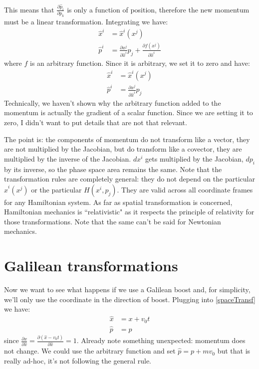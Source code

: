 \documentclass[aps,pra,10pt,floatfix,nofootinbib]{revtex4-1}
\theoremstyle{definition}
\begin{document}
This means that $\frac{\partial \hat{p}_i}{\partial p_k}$ is only a function of position, therefore the new momentum must be a linear transformation. Integrating we have:
\begin{equation*}
\begin{aligned}
\hat{x}^i &= \hat{x}^i(x^j) \\
\hat{p}^i &= \frac{\partial x^j}{\partial \hat{x}^i} p_j + \frac{\partial f(x^j)}{\partial \hat{x}^i}
\end{aligned}
\end{equation*}
where $f$ is an arbitrary function. Since it is arbitrary, we set it to zero and have:
\begin{equation}
\begin{aligned}
\hat{x}^i &= \hat{x}^i(x^j) \\
\hat{p}^i &= \frac{\partial x^j}{\partial \hat{x}^i} p_j
\end{aligned}
\label{spaceTransf}
\end{equation}
Technically, we haven't shown why the arbitrary function added to the momentum is actually the gradient of a scalar function. Since we are setting it to zero, I didn't want to put details that are not that relevant.

The point is: the components of momentum do not transform like a vector, they are not multiplied by the Jacobian, but do transform like a covector, they are multiplied by the inverse of the Jacobian. $dx^i$ gets multiplied by the Jacobian, $dp_i$ by its inverse, so the phase space area remains the same. Note that the transformation rules are completely general: they do not depend on the particular $\hat{x}^i(x^j)$ or the particular $H(x^i,p_j)$. They are valid across all coordinate frames for any Hamiltonian system. As far as spatial transformation is concerned, Hamiltonian mechanics is ``relativistic" as it respects the principle of relativity for those transformations. Note that the same can't be said for Newtonian mechanics.

\section{Galilean transformations}
Now we want to see what happens if we use a Galilean boost and, for simplicity, we'll only use the coordinate in the direction of boost. Plugging into \eqref{spaceTransf} we have:
\begin{equation}
\begin{aligned}
\hat{x} &= x + v_0 t \\
\hat{p} &= p
\end{aligned}
\label{galTransf}
\end{equation}
since $\frac{\partial x}{\partial \hat{x}} = \frac{\partial (\hat{x} - v_0 t)}{\partial \hat{x}} = 1$. Already note something unexpected: momentum does not change. We could use the arbitrary function and set $\hat{p} = p + m v_0$ but that is really ad-hoc, it's not following the general rule.
\end{document}
